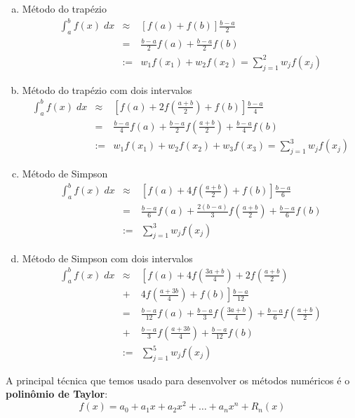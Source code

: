 \begin{ex}
\begin{enumerate}[a)]
\item Método do trapézio
\begin{eqnarray}
\int_a^b f(x)\;dx &\approx& \left[f(a)+f(b)\right]\frac{b-a}{2}\\
&=&\frac{b-a}{2}f(a)+\frac{b-a}{2}f(b)\\
&:=&w_1f(x_1)+w_2f(x_2)= \sum_{j=1}^2 w_j f(x_j)
\end{eqnarray}

\item Método do trapézio com dois intervalos
\begin{eqnarray}
\int_a^b f(x)\;dx &\approx& \left[f(a)+2f\left(\frac{a+b}{2}\right)+f(b)\right]\frac{b-a}{4}\\
&=&\frac{b-a}{4}f(a)+\frac{b-a}{2}f\left(\frac{a+b}{2}\right)+\frac{b-a}{4}f(b)\\
&:=&w_1f(x_1)+w_2f(x_2)+w_3f(x_3)= \sum_{j=1}^3 w_j f(x_j)
\end{eqnarray}

\item Método de Simpson
\begin{eqnarray}
\int_a^b f(x)\;dx &\approx& \left[f(a)+4f\left(\frac{a+b}{2}\right)+f(b)\right]\frac{b-a}{6}\\
&=&\frac{b-a}{6}f(a)+\frac{2(b-a)}{3}f\left(\frac{a+b}{2}\right)+\frac{b-a}{6}f(b)\\
&:=&\sum_{j=1}^3 w_j f(x_j)
\end{eqnarray}

\item Método de Simpson com dois intervalos
\begin{eqnarray}
\int_a^b f(x)\;dx &\approx& \left[f(a)+4f\left(\frac{3a+b}{4}\right)+2f\left(\frac{a+b}{2}\right)\right.\\
&+& \left. 4f\left(\frac{a+3b}{4}\right)+f(b)\right]\frac{b-a}{12}\\
&=&\frac{b-a}{12}f(a)+\frac{b-a}{3}f\left(\frac{3a+b}{4}\right)+\frac{b-a}{6}f\left(\frac{a+b}{2}\right)\\
&+&\frac{b-a}{3}f\left(\frac{a+3b}{4}\right)+\frac{b-a}{12}f(b)\\
&:=&\sum_{j=1}^5 w_j f(x_j)
\end{eqnarray}

\end{enumerate}
\end{ex}

A principal técnica que temos usado para desenvolver os métodos numéricos é o {\bf polinômio de Taylor}:
\begin{equation} f(x)=a_0+a_1x + a_2x^2+\ldots + a_n x^n +R_n(x) \end{equation}

